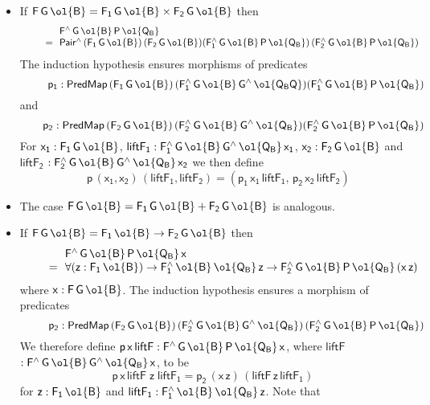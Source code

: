 \documentclass[sigplan,10pt]{acmart}
\begin{document}
\begin{itemize}
\item 
If $\mathsf{F\,G\,\ol{B} = F_1\,G\,\ol{B} \times F_2\,G\,\ol{B}}$ then
\[\begin{array}{ll}
& \!\!\mathsf{F^{\wedge}\,G\,\ol{B}\,P\,\ol{Q_B}}\\
\quad\quad= & \!\!\mathsf{Pair^{\wedge}\,(F_1\,G\,\ol{B})\, (F_2\,G\,\ol{B})%
  (F_1^{\wedge}\,G\,\ol{B}\,P\,\ol{Q_B})\,
  (F_2^{\wedge}\,G\,\ol{B}\,P\,\ol{Q_B})}
  \end{array}\] The
induction hypothesis ensures
  morphisms of predicates
  \[\quad\quad\;\;\mathsf{p_1
  : PredMap\,(F_1\,G\,\ol{B})\,(F_1^{\wedge}\,G\,\ol{B}\,G^{\wedge}\,\ol{Q_BQ})
  (F_1^{\wedge}\,G\,\ol{B}\,P\,\ol{Q_B})}\] and \[\quad\quad\mathsf{p_2 :
  PredMap\,(F_2\,G\,\ol{B})\,(F_2^{\wedge}\,G\,\ol{B}\,G^{\wedge}\,\ol{Q_B})
  (F_2^{\wedge}\,G\,\ol{B}\,P\,\ol{Q_B})}\] For $\mathsf{x_1 :
  F_1\,G\,\ol{B}}$, $\mathsf{liftF_1 :
  F_1^{\wedge}\,G\,\ol{B}\,G^{\wedge}\,\ol{Q_B}\,x_1}$, $\mathsf{x_2 :
  F_2\,G\,\ol{B}}$ and $\mathsf{liftF_2}$ $\mathsf{:
  F_2^{\wedge}\,G\,\ol{B}\,G^{\wedge}\,\ol{Q_B}\,x_2}$ we then define
\[\quad\mathsf{p\, (x_1, x_2)\, (liftF_1, liftF_2) =
  (p_1\,x_1\,liftF_1,\, p_2\,x_2\,liftF_2)}\]
\item The case $\mathsf{F\,G\,\ol{B} = F_1\,G\,\ol{B} +
  F_2\,G\,\ol{B}}$ is analogous.
\item If $\mathsf{F\,G\,\ol{B} = F_1\,\ol{B} \to F_2\,G\,\ol{B}}$ then
  \[\begin{array}{ll}
  & \!\!\mathsf{F^{\wedge}\,G\,\ol{B}\,P\,\ol{Q_B}\,x}\\
  \quad\quad= & \!\!\mathsf{\forall (z :
  F_1\,\ol{B}) \to F_1^{\wedge}\,\ol{B}\,\ol{Q_B}\,z \to
  F_2^{\wedge}\,G\,\ol{B}\,P\,\ol{Q_B}\,(x\,z)}
  \end{array}\] where $\mathsf{x :
  F\,G\,\ol{B}}$. The induction hypothesis ensures
  a morphism of predicates
  \[\quad\quad\;\;\mathsf{p_2 : PredMap\,(F_2\,G\,\ol{B})\,
  (F_2^{\wedge}\,G\,\ol{B}\,G^{\wedge}\,\ol{Q_B})\,
  (F_2^{\wedge}\,G\,\ol{B}\,P\,\ol{Q_B})}\]  We therefore define
$\mathsf{p\,x\,liftF : F^{\wedge}\,G\,\ol{B}\,P\,\ol{Q_B}\,x}$, where
$\mathsf{liftF}$ $\mathsf{: F^{\wedge}\,G\,\ol{B}\,G^{\wedge}\,\ol{Q_B}\,x}$, to
be \[\mathsf{p\,x\,liftF\;z\;liftF_1 = p_2\, (x\,z)\,
  (liftF\,z\,liftF_1)}\] for $\mathsf{z : F_1\,\ol{B}}$ and
$\mathsf{liftF_1 : F_1^{\wedge}\,\ol{B}\,\ol{Q_B}\,z}$. Note that

\end{itemize}
\end{document}

